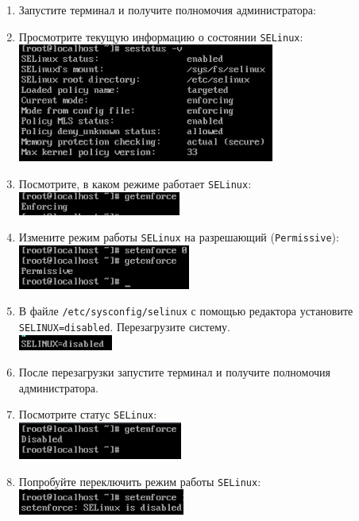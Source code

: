 \documentclass[12pt]{article}
\begin{document}
\begin{enumerate}
	\item Запустите терминал и получите полномочия администратора:
	\item Просмотрите текущую информацию о состоянии \texttt{SELinux}:
	      \\\includegraphics{1.png}
	\item Посмотрите, в каком режиме работает \texttt{SELinux}:
	      \\\includegraphics{2.png}
	\item Измените режим работы \texttt{SELinux} на разрешающий (\texttt{Permissive}):
	      \\\includegraphics{3.png}
	\item В файле \texttt{/etc/sysconfig/selinux} с помощью редактора установите \texttt{SELINUX=disabled}. Перезагрузите систему.
	      \\\includegraphics{4.png}
	\item После перезагрузки запустите терминал и получите полномочия администратора.
	\item Посмотрите статус \texttt{SELinux}:
	      \\\includegraphics{5.png}
	\item Попробуйте переключить режим работы \texttt{SELinux}:
	      \\\includegraphics{6.png}

\end{enumerate}
\end{document}

